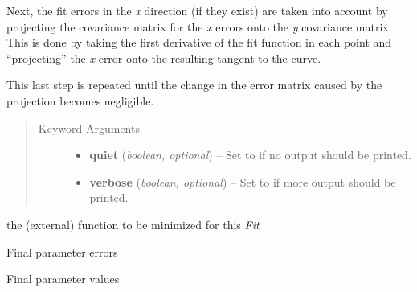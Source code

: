 \documentclass[a4paper,10pt,english]{sphinxmanual}
\begin{document}
\begin{fulllineitems}
\begin{fulllineitems}
Next, the fit errors in the \emph{x} direction (if they exist) are taken
into account by projecting the covariance matrix for the \emph{x} errors
onto the \emph{y} covariance matrix. This is done by taking the first
derivative of the fit function in each point and ``projecting'' the \emph{x}
error onto the resulting tangent to the curve.

This last step is repeated until the change in the error matrix caused
by the projection becomes negligible.
\begin{quote}\begin{description}
\item[{Keyword Arguments}] \leavevmode\begin{itemize}
\item {} 
\textbf{quiet} (\emph{boolean, optional}) --
Set to  if no output should be printed.

\item {} 
\textbf{verbose} (\emph{boolean, optional}) --
Set to  if more output should be printed.

\end{itemize}

\end{description}\end{quote}

\end{fulllineitems}


\begin{fulllineitems}
\label{module_doc:kafe.fit.Fit.external_fcn}
the (external) function to be minimized for this \emph{Fit}

\end{fulllineitems}


\begin{fulllineitems}
\label{module_doc:kafe.fit.Fit.final_parameter_errors}
Final parameter errors

\end{fulllineitems}


\begin{fulllineitems}
\label{module_doc:kafe.fit.Fit.final_parameter_values}
Final parameter values


\end{fulllineitems}
\end{fulllineitems}
\end{document}

